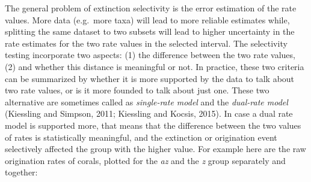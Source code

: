 \documentclass[]{article}
\begin{document}
The general problem of extinction selectivity is the error estimation of
the rate values. More data (e.g.~more taxa) will lead to more reliable
estimates while, splitting the same dataset to two subsets will lead to
higher uncertainty in the rate estimates for the two rate values in the
selected interval. The selectivity testing incorporate two aspects: (1)
the difference between the two rate values, (2) and whether this
distance is meaningful or not. In practice, these two criteria can be
summarized by whether it is more supported by the data to talk about two
rate values, or is it more founded to talk about just one. These two
alternative are sometimes called as \emph{single-rate model} and the
\emph{dual-rate model} (Kiessling and Simpson, 2011; Kiessling and
Kocsis, 2015). In case a dual rate model is supported more, that means
that the difference between the two values of rates is statistically
meaningful, and the extinction or origination event selectively affected
the group with the higher value. For example here are the raw
origination rates of corals, plotted for the \emph{az} and the \emph{z}
group separately and together:
\end{document}
